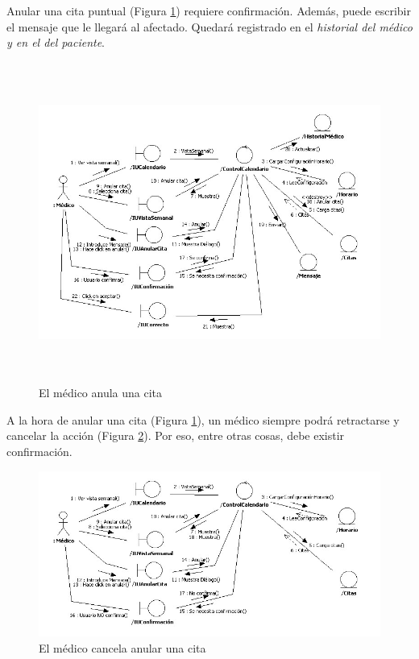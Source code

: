 		Anular una cita puntual (Figura \ref{fig:col_anular_medico}) requiere confirmación. Además, puede escribir el mensaje que le llegará al afectado. Quedará registrado en el \textit{historial del médico y en el del paciente}.
		\begin{figure}[H]
		  \centering
		    \includegraphics[width=16cm, height=10.5cm]{img/jpg/colaboraciones/9_AnularCitaMedico.jpg}
		  \caption{El médico anula una cita}
		  \label{fig:col_anular_medico}
		\end{figure}
		
		A la hora de anular una cita (Figura \ref{fig:col_anular_medico}), un médico siempre podrá retractarse y cancelar la acción (Figura \ref{fig:col_cancelaranular_medico}). Por eso, entre otras cosas, debe existir confirmación.
		
		\begin{figure}[H]
		  \centering
		    \includegraphics[width=16cm]{img/jpg/colaboraciones/10_AnularCitaMedicoCancelar.jpg}
		  \caption{El médico cancela anular una cita}
		  \label{fig:col_cancelaranular_medico}
		\end{figure}
		

